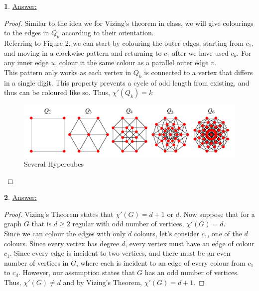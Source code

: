 \documentclass[12pt,a4paper]{article}
\theoremstyle{definition}
\newtheorem{problem}{}
\begin{document}
\begin{problem} \underline{Answer:}
\begin{proof} 
Similar to the idea we for Vizing's theorem in class, we will give colourings to the edges in $Q_k$ according to their orientation. \\

Referring to Figure 2, we can start by colouring the outer edges, starting from $c_1$, and moving in a clockwise pattern and returning to $c_1$ after we have used $c_k$. For any inner edge $u$, colour it the same colour as a parallel outer edge $v$. \\

This pattern only works as each vertex in $Q_k$ is connected to a vertex that differs in a single digit. This property prevents a cycle of odd length from existing, and thus can be coloured like so. Thus, $\chi'(Q_k) = k$

\begin{figure}[H]
    \centering
    \includegraphics[scale=0.6]{q2.png}
    \caption{Several Hypercubes}
    \label{fig:my_label}
\end{figure}
\end{proof}
\end{problem}

\begin{problem} \underline{Answer:}
\begin{proof} 
Vizing's Theorem states that $\chi'(G) = d + 1$ or $d$. Now suppose that for a graph $G$ that is $d \geq 2$ regular with odd number of vertices, $\chi'(G) = d$. \\

Since we can colour the edges with only $d$ colours, let's consider $c_1$, one of the $d$ colours. Since every vertex has degree $d$, every vertex must have an edge of colour $c_1$. Since every edge is incident to two vertices, and there must be an even number of vertices in $G$, where each is incident to an edge of every colour from $c_1$ to $c_d$. However, our assumption states that $G$ has an odd number of vertices. Thus, $\chi'(G) \neq d$ and by Vizing's Theorem, $\chi'(G) = d + 1$.
\end{proof}
\end{problem}
\end{document}
